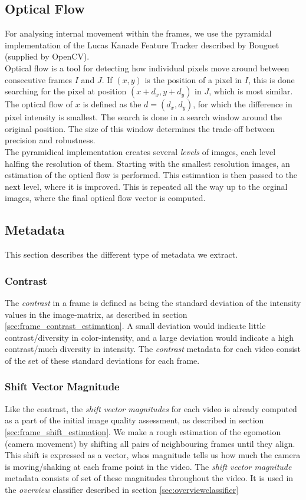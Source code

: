 \subsection{Optical Flow}
%
For analysing internal movement within the frames, we use the pyramidal implementation of the Lucas Kanade Feature Tracker described by Bouguet\cite{Bouguet2000} (supplied by OpenCV).\\
Optical flow is a tool for detecting how individual pixels move around between consecutive frames $I$ and $J$. If $(x,y)$ is the position of a pixel in $I$, this is done searching for the pixel at position $(x+d_x,y+d_y)$ in $J$, which is most similar. The optical flow of $x$ is defined as the $d=(d_x,d_y)$, for which the difference in pixel intensity is smallest. The search is done in a search window around the original position. The size of this window determines the trade-off between precision and robustness.\\
The pyramidical implementation creates several \textit{levels} of images, each level halfing the resolution of them. Starting with the smallest resolution images, an estimation of the optical flow is performed. This estimation is then passed to the next level, where it is improved. This is repeated all the way up to the orginal images, where the final optical flow vector is computed.
%
\subsection{Metadata}
%
This section describes the different type of metadata we extract.
%
\subsubsection{Contrast}\label{sec:contrastdata}
%
The \textit{contrast} in a frame is defined as being the standard deviation of the intensity values in the image-matrix, as described in section \ref{sec:frame_contrast_estimation}. A small deviation would indicate little contrast/diversity in color-intensity, and a large deviation would indicate a high contrast/much diversity in intensity. The \textit{contrast} metadata for each video consist of the set of these standard deviations for each frame.
%
\subsubsection{Shift Vector Magnitude}\label{sec:svmdata}
%
Like the contrast, the \textit{shift vector magnitudes} for each video is already computed as a part of the initial image quality assessment, as described in section \ref{sec:frame_shift_estimation}. We make a rough estimation of the egomotion (camera movement) by shifting all pairs of neighbouring frames until they align. This shift is expressed as a vector, whos magnitude tells us how much the camera is moving/shaking at each frame point in the video. The \textit{shift vector magnitude} metadata consists of set of these magnitudes throughout the video. It is used in the \textit{overview} classifier described in section \ref{sec:overviewclassifier}
%
